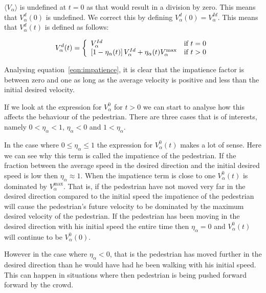 $\langle V_{\alpha}\rangle$ is undefined at $t=0$ as that would result in a 
division by zero. This means that $V^d_\alpha(0)$ is undefined. We correct 
this by defining $V^d_\alpha(0)=V^{Id}_\alpha$. This means that $V^d_\alpha(t)$ 
is defined as follows:

\begin{equation}\label{eqn:cond-define}
    V_{\alpha}^{d} (t) = \left\{ 
    \begin{array}{l l}
        V_\alpha^{Id} & \text{if $t=0$}\\
        \left[ 1 - \eta_{\alpha}(t) \right] 
        V^{Id}_{\alpha} +
        \eta_{\alpha}(t) V_{\alpha}^{\text{max}}
        & \text{if $t > 0$}\\
    \end{array} \right.
\end{equation}

Analysing equation~\eqref{eqn:impatience}, it is clear that the impatience 
factor is between zero and one as long as the average velocity is positive and 
less than the initial desired velocity. 

If we look at the expression for $V_{\alpha}^{0}$ for $t>0$ we can 
start to analyse how this affects the behaviour of the pedestrian. There 
are three cases that is of interests, namely $0 < \eta_{\alpha} < 1$, 
$\eta_{\alpha} < 0$ and $1 < \eta_{\alpha} $.

In the case where $0 \leq \eta_{\alpha} \leq 1$ the expression for 
$V_{\alpha}^{0} \left( t \right)$ makes a lot of sense. Here we can see why this term 
is called the impatience of the pedestrian. If the fraction  between the average 
speed in the desired direction and the initial desired speed is low then 
$\eta_{\alpha} \approx 1$. 
When the impatience term is close to one $V_{\alpha}^{0} \left( t \right)$ is 
dominated by $V_{\alpha}^{\text{max}}$. That is, if the pedestrian have not moved 
very far in the desired direction compared to the initial speed the impatience 
of the pedestrian will cause the pedestrian's future velocity to be dominated by the 
maximum desired velocity of the pedestrian. 
If the pedestrian has been moving in the desired direction with his initial speed 
the entire time then $\eta_{\alpha} = 0$  and $V_{\alpha}^{0} \left( t 
\right)$ will continue to be $V_{\alpha}^{0} \left( 0 \right)$. 

However in the case where $\eta_{\alpha} < 0$, that is the pedestrian has moved 
further in the desired direction than he would have had he been walking with his 
initial speed. This can happen in situations where then pedestrian is being pushed 
forward forward by the crowd.

